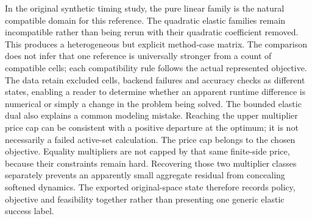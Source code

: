 In the original synthetic timing study, the pure linear family is the natural
compatible domain for this reference. The quadratic elastic families remain
incompatible rather than being rerun with their quadratic coefficient removed.
This produces a heterogeneous but explicit method-case matrix. The comparison
does not infer that one reference is universally stronger from a count of
compatible cells; each compatibility rule follows the actual represented
objective. The data retain excluded cells, backend failures and accuracy checks
as different states, enabling a reader to determine whether an apparent runtime
difference is numerical or simply a change in the problem being solved.
The bounded elastic dual also explains a common modeling mistake. Reaching
the upper multiplier price cap can be consistent with a positive departure
at the optimum; it is not necessarily a failed active-set calculation.
The price cap belongs to the chosen objective. Equality multipliers are
not capped by that same finite-side price, because their constraints remain
hard. Recovering those two multiplier classes separately prevents an apparently
small aggregate residual from concealing softened dynamics. The exported
original-space state therefore records policy, objective and feasibility
together rather than presenting one generic elastic success label.

